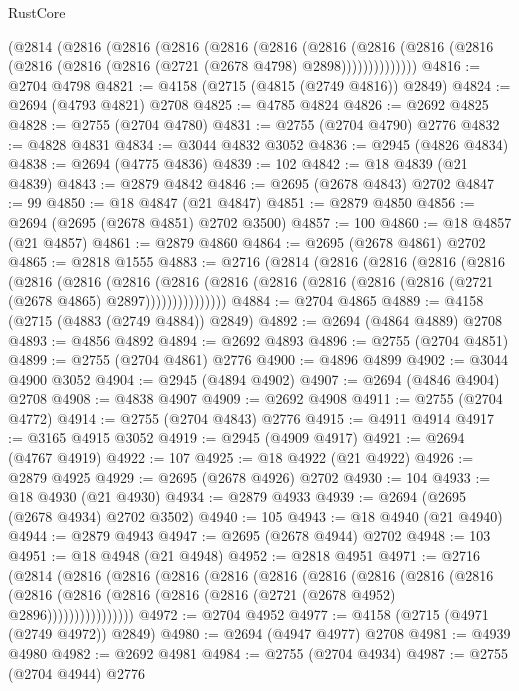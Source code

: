\begin{lexlean}{RustCore}
\begin{coremodule}
    (@2814
      (@2816
        (@2816
          (@2816
            (@2816
              (@2816
                (@2816
                  (@2816 (@2816 (@2816 (@2816 (@2816 (@2816 (@2721 (@2678 @4798) @2898))))))))))))))
@4816 := @2704 @4798
@4821 := @4158 (@2715 (@4815 (@2749 @4816)) @2849)
@4824 := @2694 (@4793 @4821) @2708
@4825 := @4785 @4824
@4826 := @2692 @4825
@4828 := @2755 (@2704 @4780)
@4831 := @2755 (@2704 @4790) @2776
@4832 := @4828 @4831
@4834 := @3044 @4832 @3052
@4836 := @2945 (@4826 @4834)
@4838 := @2694 (@4775 @4836)
@4839 := 102
@4842 := @18 @4839 (@21 @4839)
@4843 := @2879 @4842
@4846 := @2695 (@2678 @4843) @2702
@4847 := 99
@4850 := @18 @4847 (@21 @4847)
@4851 := @2879 @4850
@4856 := @2694 (@2695 (@2678 @4851) @2702 @3500)
@4857 := 100
@4860 := @18 @4857 (@21 @4857)
@4861 := @2879 @4860
@4864 := @2695 (@2678 @4861) @2702
@4865 := @2818 @1555
@4883 := @2716
    (@2814
      (@2816
        (@2816
          (@2816
            (@2816
              (@2816
                (@2816
                  (@2816
                    (@2816
                      (@2816 (@2816 (@2816 (@2816 (@2816 (@2721 (@2678 @4865) @2897)))))))))))))))
@4884 := @2704 @4865
@4889 := @4158 (@2715 (@4883 (@2749 @4884)) @2849)
@4892 := @2694 (@4864 @4889) @2708
@4893 := @4856 @4892
@4894 := @2692 @4893
@4896 := @2755 (@2704 @4851)
@4899 := @2755 (@2704 @4861) @2776
@4900 := @4896 @4899
@4902 := @3044 @4900 @3052
@4904 := @2945 (@4894 @4902)
@4907 := @2694 (@4846 @4904) @2708
@4908 := @4838 @4907
@4909 := @2692 @4908
@4911 := @2755 (@2704 @4772)
@4914 := @2755 (@2704 @4843) @2776
@4915 := @4911 @4914
@4917 := @3165 @4915 @3052
@4919 := @2945 (@4909 @4917)
@4921 := @2694 (@4767 @4919)
@4922 := 107
@4925 := @18 @4922 (@21 @4922)
@4926 := @2879 @4925
@4929 := @2695 (@2678 @4926) @2702
@4930 := 104
@4933 := @18 @4930 (@21 @4930)
@4934 := @2879 @4933
@4939 := @2694 (@2695 (@2678 @4934) @2702 @3502)
@4940 := 105
@4943 := @18 @4940 (@21 @4940)
@4944 := @2879 @4943
@4947 := @2695 (@2678 @4944) @2702
@4948 := 103
@4951 := @18 @4948 (@21 @4948)
@4952 := @2818 @4951
@4971 := @2716
    (@2814
      (@2816
        (@2816
          (@2816
            (@2816
              (@2816
                (@2816
                  (@2816
                    (@2816
                      (@2816
                        (@2816
                          (@2816 (@2816 (@2816 (@2816 (@2721 (@2678 @4952) @2896))))))))))))))))
@4972 := @2704 @4952
@4977 := @4158 (@2715 (@4971 (@2749 @4972)) @2849)
@4980 := @2694 (@4947 @4977) @2708
@4981 := @4939 @4980
@4982 := @2692 @4981
@4984 := @2755 (@2704 @4934)
@4987 := @2755 (@2704 @4944) @2776

\end{coremodule}
\end{lexlean}
